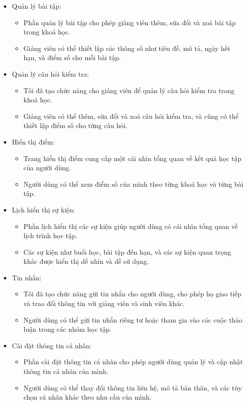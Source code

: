 \documentclass[../Thesis.tex]{subfiles}
\begin{document}
\begin{itemize}
        \item Quản lý bài tập:
            \begin{itemize}
                \item Phần quản lý bài tập cho phép giảng viên thêm, sửa đổi và xoá bài tập trong khoá học.
                \item Giảng viên có thể thiết lập các thông số như tiêu đề, mô tả, ngày hết hạn, và điểm số cho mỗi bài tập.
            \end{itemize}
        \item Quản lý câu hỏi kiểm tra:
            \begin{itemize}
                \item Tôi đã tạo chức năng cho giảng viên để quản lý câu hỏi kiểm tra trong khoá học.
                \item Giảng viên có thể thêm, sửa đổi và xoá câu hỏi kiểm tra, và cũng có thể thiết lập điểm số cho từng câu hỏi.
            \end{itemize}
        \item Hiển thị điểm:
            \begin{itemize}
                \item Trang hiển thị điểm cung cấp một cái nhìn tổng quan về kết quả học tập của người dùng.
                \item Người dùng có thể xem điểm số của mình theo từng khoá học và từng bài tập.
            \end{itemize}
        \item Lịch hiển thị sự kiện:
            \begin{itemize}
                \item Phần lịch hiển thị các sự kiện giúp người dùng có cái nhìn tổng quan về lịch trình học tập.
                \item Các sự kiện như buổi học, bài tập đến hạn, và các sự kiện quan trọng khác được hiển thị dễ nhìn và dễ sử dụng.
            \end{itemize}
        \item Tin nhắn:
            \begin{itemize}
                \item Tôi đã tạo chức năng gửi tin nhắn cho người dùng, cho phép họ giao tiếp và trao đổi thông tin với giảng viên và sinh viên khác.
                \item Người dùng có thể gửi tin nhắn riêng tư hoặc tham gia vào các cuộc thảo luận trong các nhóm học tập.
            \end{itemize}
        \item Cài đặt thông tin cá nhân:
            \begin{itemize}
                \item Phần cài đặt thông tin cá nhân cho phép người dùng quản lý và cập nhật thông tin cá nhân của mình.
                \item Người dùng có thể thay đổi thông tin liên hệ, mô tả bản thân, và các tùy chọn cá nhân khác theo nhu cầu của mình.
            \end{itemize}
    \end{itemize}
    
\end{document}
